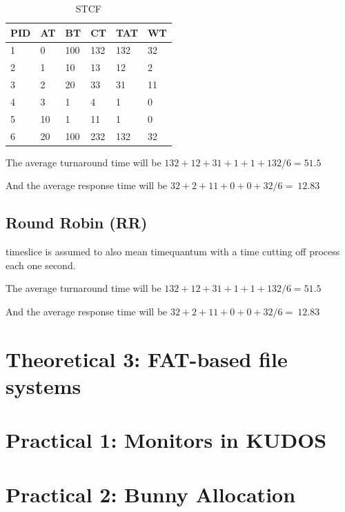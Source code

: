 \documentclass[11pt,a4paper]{article}
\theoremstyle{plain}
\theoremstyle{definition}
\theoremstyle{remark}
\numberwithin{equation}{section}
\begin{document}
\begin{table}[H]
	\centering
	\caption{STCF}
	\label{t2-stcf}
	\begin{tabular}{llllll}
		\hline
		\multicolumn{1}{|l|}{PID} & \multicolumn{1}{l|}{AT} & \multicolumn{1}{l|}{BT} & \multicolumn{1}{l|}{CT} & \multicolumn{1}{l|}{TAT} & \multicolumn{1}{l|}{WT} \\ \hline
		1                         & 0                       & 100                     & 132                     & 132                      & 32                      \\
		2                         & 1                       & 10                      & 13                      & 12                       & 2                       \\
		3                         & 2                       & 20                      & 33                      & 31                       & 11                      \\
		4                         & 3                       & 1                       & 4                       & 1                        & 0                       \\
		5                         & 10                      & 1                       & 11                      & 1                        & 0                       \\
		6                         & 20                      & 100                     & 232                     & 132                      & 32                     
	\end{tabular}
\end{table}

The average turnaround time will be $132+12+31+1+1+132/6=51.5$

And the average response time will be $32+2+11+0+0+32/6=~12.83$

\subsection*{Round Robin (RR)}

timeslice is assumed to also mean timequantum with a time cutting off process each one second.





The average turnaround time will be $132+12+31+1+1+132/6=51.5$

And the average response time will be $32+2+11+0+0+32/6=~12.83$

\section*{Theoretical 3: FAT-based file systems}




\section*{Practical 1: Monitors in KUDOS}




\section*{Practical 2: Bunny Allocation}







%
%
\end{document}
